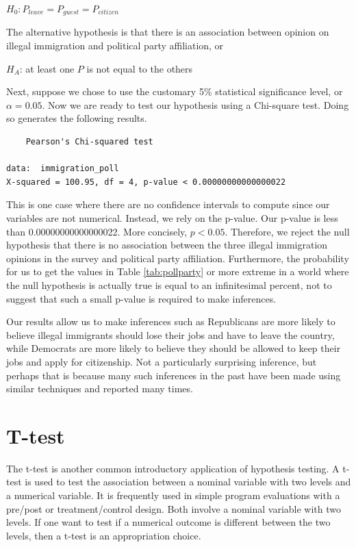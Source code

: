 \documentclass[
]{book}
\begin{document}
\(H_0: P_{leave} = P_{guest} = P_{citizen}\)

The alternative hypothesis is that there is an association between opinion on illegal immigration and political party affiliation, or

\(H_A\): at least one \(P\) is not equal to the others

Next, suppose we chose to use the customary 5\% statistical significance level, or \(\alpha=0.05\). Now we are ready to test our hypothesis using a Chi-square test. Doing so generates the following results.

\begin{verbatim}
	Pearson's Chi-squared test

data:  immigration_poll
X-squared = 100.95, df = 4, p-value < 0.00000000000000022
\end{verbatim}

This is one case where there are no confidence intervals to compute since our variables are not numerical. Instead, we rely on the p-value. Our p-value is less than 0.00000000000000022. More concisely, \(p<0.05\). Therefore, we reject the null hypothesis that there is no association between the three illegal immigration opinions in the survey and political party affiliation. Furthermore, the probability for us to get the values in Table \ref{tab:pollparty} or more extreme in a world where the null hypothesis is actually true is equal to an infinitesimal percent, not to suggest that such a small p-value is required to make inferences.

Our results allow us to make inferences such as Republicans are more likely to believe illegal immigrants should lose their jobs and have to leave the country, while Democrats are more likely to believe they should be allowed to keep their jobs and apply for citizenship. Not a particularly surprising inference, but perhaps that is because many such inferences in the past have been made using similar techniques and reported many times.

\hypertarget{t-test}{%
\section{T-test}\label{t-test}}

The t-test is another common introductory application of hypothesis testing. A t-test is used to test the association between a nominal variable with two levels and a numerical variable. It is frequently used in simple program evaluations with a pre/post or treatment/control design. Both involve a nominal variable with two levels. If one want to test if a numerical outcome is different between the two levels, then a t-test is an appropriation choice.
\end{document}
